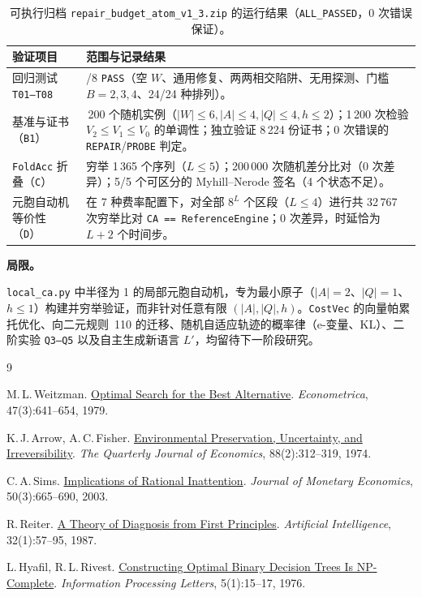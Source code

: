 \documentclass[11pt,a4paper]{article}
\theoremstyle{preprintthm}
\theoremstyle{preprintdef}
\newcommand{\subheading}[1]{\par\addvspace{8pt}\noindent\textbf{#1}\par\nobreak}
\begin{document}
\begin{table}[!htbp]
\centering
\caption{可执行归档 \texttt{repair\_budget\_atom\_v1\_3.zip} 的运行结果（\texttt{ALL\_PASSED}，0 次错误保证）。}
\label{tab:exec}
\footnotesize
\begin{tabularx}{\linewidth}{@{}l >{\raggedright\arraybackslash}X@{}}
\toprule
\textbf{验证项目} & \textbf{范围与记录结果} \\
\midrule
回归测试 \texttt{T01--T08} & 8/8 \texttt{PASS}（空 $W$、通用修复、两两相交陷阱、无用探测、门槛 $B=2,3,4$、24/24 种排列）。 \\
基准与证书（\texttt{B1}） & 1\,200 个随机实例（$|W|\le6, |A|\le4, |Q|\le4, h\le2$）；1\,200 次检验 $V_2\le V_1\le V_0$ 的单调性；独立验证 8\,224 份证书；0 次错误的 \texttt{REPAIR}/\texttt{PROBE} 判定。 \\
\texttt{FoldAcc} 折叠（\texttt{C}） & 穷举 1\,365 个序列（$L\le5$）；200\,000 次随机差分比对（0 次差异）；5/5 个可区分的 Myhill--Nerode 签名（4 个状态不足）。 \\
元胞自动机等价性（\texttt{D}） & 在 7 种费率配置下，对全部 $8^L$ 个区段（$L\le4$）进行共 32\,767 次穷举比对 \texttt{CA == ReferenceEngine}；0 次差异，时延恰为 $L+2$ 个时间步。 \\
\bottomrule
\end{tabularx}
\end{table}

\subheading{局限。}
\texttt{local\_ca.py} 中半径为 1 的局部元胞自动机，专为最小原子（$|A|=2$、$|Q|=1$、$h\le1$）构建并穷举验证，而非针对任意有限 $(|A|,|Q|,h)$。\texttt{CostVec} 的向量帕累托优化、向二元规则~110 的迁移、随机自适应轨迹的概率律（e-变量、KL）、二阶实验 \texttt{Q3--Q5} 以及自主生成新语言 $L'$，均留待下一阶段研究。
\begin{thebibliography}{9}
\small\setlength{\itemsep}{1pt}

M.\,L.\,Weitzman. \href{https://scholar.harvard.edu/files/weitzman/files/optimalsearchbestalternative.pdf}{Optimal Search for the Best Alternative}. \emph{Econometrica}, 47(3):641--654, 1979.

K.\,J.\,Arrow, A.\,C.\,Fisher. \href{https://doi.org/10.2307/1883074}{Environmental Preservation, Uncertainty, and Irreversibility}. \emph{The Quarterly Journal of Economics}, 88(2):312--319, 1974.

C.\,A.\,Sims. \href{https://doi.org/10.1016/S0304-3932(03)00029-1}{Implications of Rational Inattention}. \emph{Journal of Monetary Economics}, 50(3):665--690, 2003.

R.\,Reiter. \href{https://doi.org/10.1016/0004-3702(87)90062-2}{A Theory of Diagnosis from First Principles}. \emph{Artificial Intelligence}, 32(1):57--95, 1987.

L.\,Hyafil, R.\,L.\,Rivest. \href{https://www.sciencedirect.com/science/article/abs/pii/0020019076900958}{Constructing Optimal Binary Decision Trees Is NP-Complete}. \emph{Information Processing Letters}, 5(1):15--17, 1976.

\end{thebibliography}
\end{document}

